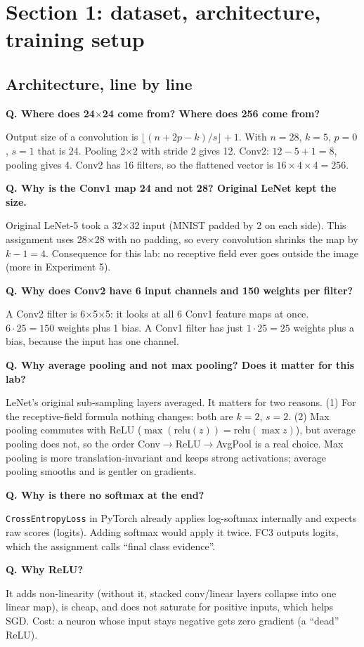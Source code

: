 \documentclass[11pt]{article}
\newcommand{\Q}[1]{\par\vspace{4pt}\noindent\textcolor{qcol}{\textbf{Q. #1}}\par\nopagebreak}
\newcommand{\A}[1]{\noindent #1\par}
\begin{document}
\section{Section 1: dataset, architecture, training setup}

\subsection{Architecture, line by line}

\Q{Where does 24$\times$24 come from? Where does 256 come from?}
\A{Output size of a convolution is $\lfloor (n+2p-k)/s\rfloor+1$. With $n=28$, $k=5$, $p=0$, $s=1$ that is 24. Pooling 2$\times$2 with stride 2 gives 12. Conv2: $12-5+1=8$, pooling gives 4. Conv2 has 16 filters, so the flattened vector is $16\times4\times4=256$.}

\Q{Why is the Conv1 map 24 and not 28? Original LeNet kept the size.}
\A{Original LeNet-5 took a 32$\times$32 input (MNIST padded by 2 on each side). This assignment uses 28$\times$28 with no padding, so every convolution shrinks the map by $k-1=4$. Consequence for this lab: no receptive field ever goes outside the image (more in Experiment 5).}

\Q{Why does Conv2 have 6 input channels and 150 weights per filter?}
\A{A Conv2 filter is 6$\times$5$\times$5: it looks at all 6 Conv1 feature maps at once. $6\cdot25=150$ weights plus 1 bias. A Conv1 filter has just $1\cdot25=25$ weights plus a bias, because the input has one channel.}

\Q{Why average pooling and not max pooling? Does it matter for this lab?}
\A{LeNet's original sub-sampling layers averaged. It matters for two reasons. (1) For the receptive-field formula nothing changes: both are $k=2$, $s=2$. (2) Max pooling commutes with ReLU ($\max(\text{relu}(z))=\text{relu}(\max z)$), but average pooling does not, so the order Conv$\to$ReLU$\to$AvgPool is a real choice. Max pooling is more translation-invariant and keeps strong activations; average pooling smooths and is gentler on gradients.}

\Q{Why is there no softmax at the end?}
\A{\texttt{CrossEntropyLoss} in PyTorch already applies log-softmax internally and expects raw scores (logits). Adding softmax would apply it twice. FC3 outputs logits, which the assignment calls ``final class evidence''.}

\Q{Why ReLU?}
\A{It adds non-linearity (without it, stacked conv/linear layers collapse into one linear map), is cheap, and does not saturate for positive inputs, which helps SGD. Cost: a neuron whose input stays negative gets zero gradient (a ``dead'' ReLU).}
\end{document}
